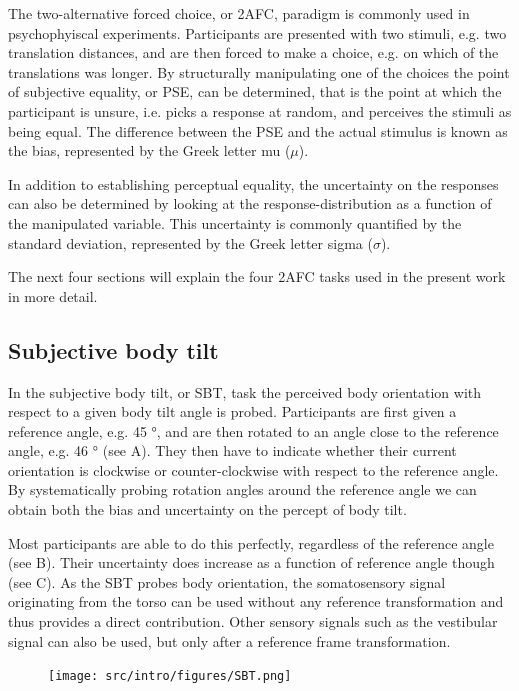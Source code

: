 The two-alternative forced choice, or 2AFC, paradigm is commonly used in psychophyiscal experiments. Participants are presented with two stimuli, e.g. two translation distances, and are then forced to make a choice, e.g. on which of the translations was longer. By structurally manipulating one of the choices the point of subjective equality, or PSE, can be determined, that is the point at which the participant is unsure, i.e. picks a response at random, and perceives the stimuli as being equal. The difference between the PSE and the actual stimulus is known as the bias, represented by the Greek letter mu ($\mu$).

In addition to establishing perceptual equality, the uncertainty on the responses can also be determined by looking at the response-distribution as a function of the manipulated variable. This uncertainty is commonly quantified by the standard deviation, represented by the Greek letter sigma ($\sigma$).

The next four sections will explain the four 2AFC tasks used in the present work in more detail.

\subsection{Subjective body tilt}
In the subjective body tilt, or SBT, task the perceived body orientation with respect to a given body tilt angle is probed. Participants are first given a reference angle, e.g. 45 \si{\degree}, and are then rotated to an angle close to the reference angle, e.g. 46 \si{\degree} (see A). They then have to indicate whether their current orientation is clockwise or counter-clockwise with respect to the reference angle. By systematically probing rotation angles around the reference angle we can obtain both the bias and uncertainty on the percept of body tilt.

Most participants are able to do this perfectly, regardless of the reference angle (see B). Their uncertainty does increase as a function of reference angle though (see C).
As the SBT probes body orientation, the somatosensory signal originating from the torso can be used without any reference transformation and thus provides a direct contribution. Other sensory signals such as the vestibular signal can also be used, but only after a reference frame transformation.

\begin{figure}
    \texttt{[image: src/intro/figures/SBT.png]}

    \caption{}
    \label{intro:fig4}
\end{figure}


